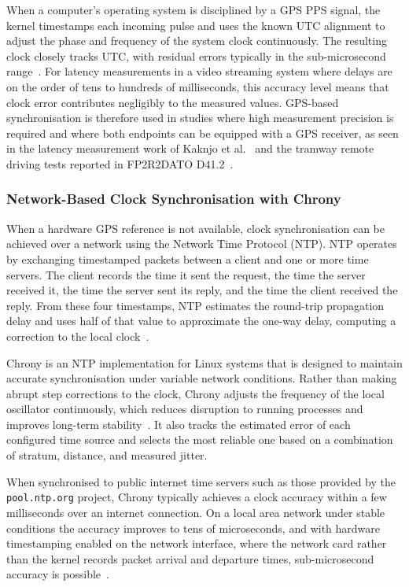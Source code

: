 When a computer's operating system is disciplined by a GPS PPS signal, the kernel timestamps each incoming pulse and uses the known UTC alignment to adjust the phase and frequency of the system clock continuously. The resulting clock closely tracks UTC, with residual errors typically in the sub-microsecond range~\cite{sesia2010}. For latency measurements in a video streaming system where delays are on the order of tens to hundreds of milliseconds, this accuracy level means that clock error contributes negligibly to the measured values. GPS-based synchronisation is therefore used in studies where high measurement precision is required and where both endpoints can be equipped with a GPS receiver, as seen in the latency measurement work of Kaknjo et al.~\cite{kaknjo2018} and the tramway remote driving tests reported in FP2R2DATO D41.2~\cite{fp2r2dato2024d41_2}.

\subsubsection{Network-Based Clock Synchronisation with Chrony}\label{subsubsec:chrony-sync}

When a hardware GPS reference is not available, clock synchronisation can be achieved over a network using the Network Time Protocol (NTP). NTP operates by exchanging timestamped packets between a client and one or more time servers. The client records the time it sent the request, the time the server received it, the time the server sent its reply, and the time the client received the reply. From these four timestamps, NTP estimates the round-trip propagation delay and uses half of that value to approximate the one-way delay, computing a correction to the local clock~\cite{rfc5905}.

Chrony is an NTP implementation for Linux systems that is designed to maintain accurate synchronisation under variable network conditions. Rather than making abrupt step corrections to the clock, Chrony adjusts the frequency of the local oscillator continuously, which reduces disruption to running processes and improves long-term stability~\cite{chronyproject}. It also tracks the estimated error of each configured time source and selects the most reliable one based on a combination of stratum, distance, and measured jitter.

When synchronised to public internet time servers such as those provided by the \texttt{pool.ntp.org} project, Chrony typically achieves a clock accuracy within a few milliseconds over an internet connection. On a local area network under stable conditions the accuracy improves to tens of microseconds, and with hardware timestamping enabled on the network interface, where the network card rather than the kernel records packet arrival and departure times, sub-microsecond accuracy is possible~\cite{redhat2024chrony, redhat2024hw}.

